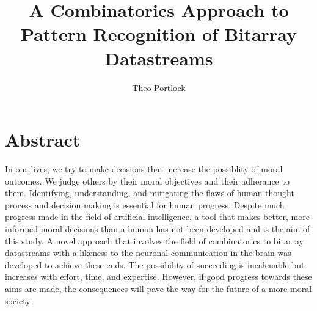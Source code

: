 \documentclass{book}
\title{A Combinatorics Approach to Pattern Recognition of Bitarray Datastreams}
\author{Theo Portlock}
\begin{document}
\frontmatter
\maketitle

\chapter{Abstract}
In our lives, we try to make decisions that increase the possiblity of moral outcomes.
We judge others by their moral objectives and their adherance to them.
Identifying, understanding, and mitigating the flaws of human thought process and decision making is essential for human progress.
Despite much progress made in the field of artificial intelligence, a tool that makes better, more informed moral decisions than a human has not been developed and is the aim of this study.
A novel approach that involves the field of combinatorics to bitarray datastreams with a likeness to the neuronal communication in the brain was developed to achieve these ends.
The possibility of succeeding is incalcuable but increases with effort, time, and expertise.
However, if good progress towards these aims are made, the consequences will pave the way for the future of a more moral society.

\cleardoublepage
{}
{}
\tableofcontents

\cleardoublepage
{}
{}
\listoffigures

\cleardoublepage
{}
{}
\listoftables

\mainmatter







\backmatter


\end{document}
